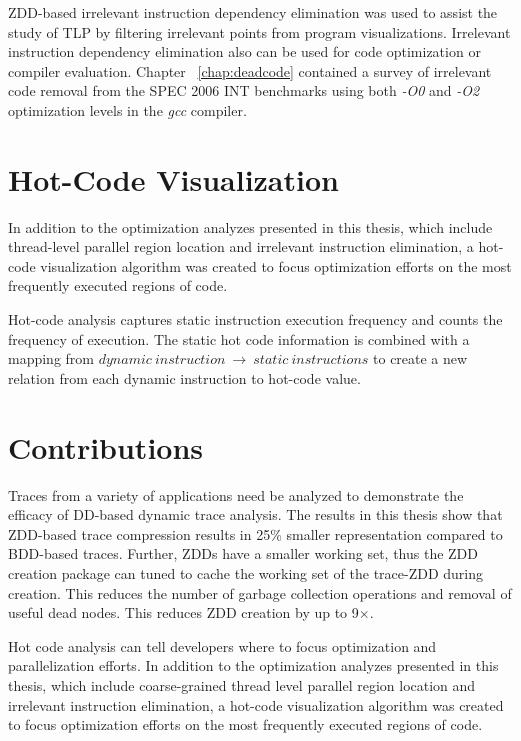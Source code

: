 \documentclass[defaultstyle,11pt]{thesis}
\begin{document}
ZDD-based irrelevant instruction dependency elimination was used to
assist the study of TLP by filtering irrelevant points from program
visualizations.  Irrelevant instruction dependency elimination also
can be used for code optimization or compiler evaluation.  Chapter
~\ref{chap:deadcode} contained a survey of irrelevant code removal
from the SPEC 2006 INT benchmarks using both \textit{-O0} and
\textit{-O2} optimization levels in the \textit{gcc} compiler.

\section{Hot-Code Visualization}

In addition to the optimization analyzes presented in this thesis,
which include thread-level parallel region location and irrelevant
instruction elimination, a hot-code visualization algorithm was
created to focus optimization efforts on the most frequently executed
regions of code.

Hot-code analysis captures static instruction execution frequency and
counts the frequency of execution.  The static hot code information is
combined with a mapping from $dynamic\ instruction \ \rightarrow
\ static\ instructions$ to create a new relation from each dynamic
instruction to hot-code value.

\section{Contributions}

Traces from a variety of applications need be analyzed to demonstrate
the efficacy of DD-based dynamic trace analysis. The results in this
thesis show that ZDD-based trace compression results in 25\% smaller
representation compared to BDD-based traces.  Further, ZDDs have a
smaller working set, thus the ZDD creation package can tuned to cache
the working set of the trace-ZDD during creation.  This reduces the
number of garbage collection operations and removal of useful dead
nodes. This reduces ZDD creation by up to 9$\times$.

Hot code analysis can tell developers where to focus optimization and
parallelization efforts. In addition to the optimization analyzes
presented in this thesis, which include coarse-grained thread level
parallel region location and irrelevant instruction elimination, a
hot-code visualization algorithm was created to focus optimization
efforts on the most frequently executed regions of code.
\end{document}
